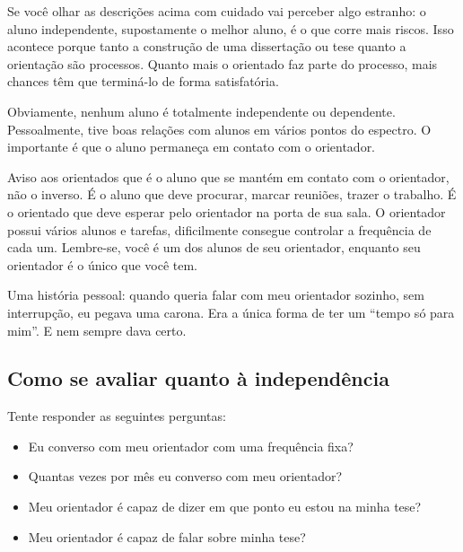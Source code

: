 Se você olhar as descrições acima com cuidado vai perceber algo estranho: o aluno independente, supostamente o melhor aluno, é o que corre mais riscos. Isso acontece porque tanto a construção de uma dissertação ou tese quanto a orientação são processos. Quanto mais o orientado faz parte do processo, mais chances têm que terminá-lo de forma satisfatória.


Obviamente, nenhum aluno é totalmente independente ou dependente. Pessoalmente, tive boas relações com alunos em vários pontos do espectro. O importante é que o aluno permaneça em contato com o orientador. 


Aviso aos orientados que é o aluno que se mantém em contato com o orientador, não o inverso. É o aluno que deve procurar, marcar reuniões, trazer o trabalho. É o orientado que deve esperar pelo orientador na porta de sua sala. O orientador possui vários alunos e tarefas, dificilmente consegue controlar a frequência de cada um. Lembre-se, você é um dos alunos de seu orientador, enquanto seu orientador é o único que você tem.




Uma história pessoal: quando queria falar com meu orientador sozinho, sem interrupção, eu pegava uma carona. Era a única forma de ter um “tempo só para mim”. E nem sempre dava certo.


\subsection{Como se avaliar quanto à independência}


Tente responder as seguintes perguntas:
\begin{itemize}
	\item Eu converso com meu orientador com uma frequência fixa?
	\item Quantas vezes por mês eu converso com meu orientador?
	\item Meu orientador é capaz de dizer em que ponto eu estou na minha tese?
	\item Meu orientador é capaz de falar sobre minha tese?
\end{itemize}



